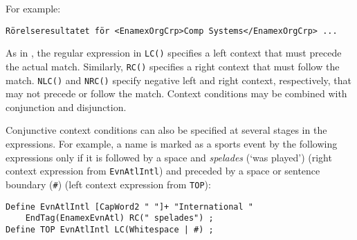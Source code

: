 \documentclass{llncs}
\begin{document}
\noindent
For example:
\begin{verbatim}
Rörelseresultatet för <EnamexOrgCrp>Comp Systems</EnamexOrgCrp> ...
\end{verbatim}

As in \cite{karttunen/2011}, the regular expression in \texttt{LC()}
specifies a left context that must precede the actual match.
Similarly, \texttt{RC()}
specifies a right context that must follow the match. \texttt{NLC()}
and \texttt{NRC()} specify negative left and right context,
respectively, that may not precede or follow the match.
Context conditions may be combined with conjunction and disjunction.





Conjunctive context conditions can also be specified at several stages in the
expressions. For example, a name is marked as a sports event by the
following expressions only if it is followed by a space and
\textit{spelades} (`was played') (right context expression from
\texttt{EvnAtlIntl}) and preceded by a space or sentence boundary
(\texttt{\#}) (left context expression from \texttt{TOP}):

\begin{verbatim}
Define EvnAtlIntl [CapWord2 " "]+ "International "
    EndTag(EnamexEvnAtl) RC(" spelades") ;
Define TOP EvnAtlIntl LC(Whitespace | #) ;
\end{verbatim}
\end{document}
